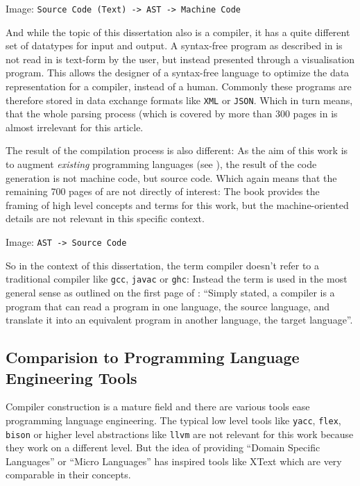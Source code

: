 Image: \texttt{Source Code (Text) -> AST -> Machine Code}

And while the topic of this dissertation also is a compiler, it has a quite different set of datatypes for input and output. A syntax-free program as described in  is not read in is text-form by the user, but instead presented through a visualisation program. This allows the designer of a syntax-free language to optimize the data representation for a compiler, instead of a human. Commonly these programs are therefore stored in data exchange formats like \texttt{XML} or \texttt{JSON}. Which in turn means, that the whole parsing process (which is covered by more than 300 pages in \cite{dragon_book} is almost irrelevant for this article.

The result of the compilation process is also different: As the aim of this work is to augment \textit{existing} programming languages (see ), the result of the code generation is not machine code, but source code. Which again means that the remaining 700 pages of \cite{dragon_book} are not directly of interest: The book provides the framing of high level concepts and terms for this work, but the machine-oriented details are not relevant in this specific context.

Image: \texttt{AST -> Source Code}

So in the context of this dissertation, the term compiler doesn't refer to a traditional compiler like \texttt{gcc}, \texttt{javac} or \texttt{ghc}: Instead the term is used in the most general sense as outlined on the first page of \cite{dragon_book}: \enquote{Simply stated, a compiler is a program that can read a program in one language, the source language, and translate it into an equivalent program in another language, the target language}.

\subsection{Comparision to Programming Language Engineering Tools}

Compiler construction is a mature field and there are various tools ease programming language engineering. The typical low level tools like \texttt{yacc}, \texttt{flex}, \texttt{bison} or higher level abstractions like \texttt{llvm} are not relevant for this work because they work on a different level. But the idea of providing \enquote{Domain Specific Languages} or \enquote{Micro Languages} has inspired tools like XText \cite{efftinge_xtext} which are very comparable in their concepts.

